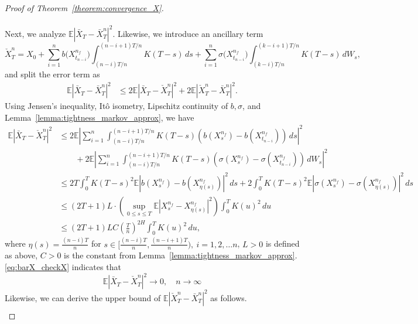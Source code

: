 \documentclass[11pt]{article}%
\theoremstyle{definition}
\begin{document}
\begin{proof}[Proof of Theorem~\ref{theorem:convergence_X}]
    \paragraph{} Next, we analyze \(\mathbb{E} |\bar{X}_T - \bar{X}_T^n|^2\). Likewise, we introduce an ancillary term 
    \begin{equation*}
        \check{X}_T^n = X_0 + \sum_{i=1}^{n} b\bigl(X_{t_{n-i}}^{n_f}\bigr) \int_{(n-i)T/n}^{(n-i+1)T/n} K(T-s)\,ds + \sum_{i=1}^{n} \sigma\bigl(X_{t_{n-i}}^{n_f}\bigr) \int_{(k-i)T/n}^{(k-i+1)T/n} K(T-s)\,dW_s,
    \end{equation*}
    and split the error term as
    \begin{align*}
        \mathbb{E} |\bar{X}_T - \bar{X}_T^n|^2 &\le 2\mathbb{E}|\bar{X}_T - \check{X}_T^n|^2 + 2\mathbb{E}|\check{X}_T^n - \bar{X}_T^n|^2.
    \end{align*}
    Using Jensen's inequality, It\^o isometry, Lipschitz continuity of \(b,\sigma\), and Lemma~\ref{lemma:tightness_markov_approx}, we have
    \begin{align}
        \mathbb{E}|\bar{X}_T - \check{X}_T^n|^2 &\le 2\mathbb{E} \left|\sum_{i=1}^n \int_{(n-i)T/n}^{(n-i+1)T/n} K(T-s) (b(X_s^{n_f}) - b(X_{t_{n-i}}^{n_f}))\,ds\right|^2\nonumber\\
        &\qquad + 2\mathbb{E}\left| \sum_{i=1}^n \int_{(n-i)T/n}^{(n-i+1)T/n} K(T-s) (\sigma(X_s^{n_f}) - \sigma(X_{t_{n-i}}^{n_f}))\,dW_s\right|^2\nonumber\\
        &\le 2T \int_{0}^{T} K(T-s)^2 \mathbb{E} |b(X_s^{n_f}) - b(X_{\eta(s)}^{n_f})|^2\,ds + 2\int_{0}^{T} K(T-s)^2 \mathbb{E} |\sigma(X_s^{n_f}) - \sigma(X_{\eta(s)}^{n_f})|^2\,ds\nonumber\\ 
        &\le (2T+1)L \cdot \left(\sup_{0\le s\le T} \mathbb{E} |X_s^{n_f} - X_{\eta(s)}^{n_f}|^2\right) \int_{0}^{T} K(u)^2 \,du\nonumber\\
        &\le (2T+1)LC \left(\frac{T}{n}\right)^{2H} \int_{0}^{T} K(u)^2 \,du,\label{eq:barX_checkX}
    \end{align}
    where \(\eta(s) = \tfrac{(n-i)T}{n}\) for \(s \in [\tfrac{(n-i)T}{n},\tfrac{(n-i+1)T}{n}),\ i=1,2,\ldots n\), \(L>0\) is defined as above, \(C>0\) is the constant from Lemma~\ref{lemma:tightness_markov_approx}. \eqref{eq:barX_checkX} indicates that 
    \[
        \mathbb{E}|\bar{X}_T - \check{X}_T^n|^2 \to 0,\quad n\to \infty
    \]
    Likewise, we can derive the upper bound of \(\mathbb{E}|\check{X}_T^n - \bar{X}_T^n|^2\) as follows.
    \begin{align}

\end{align}
\end{proof}
\end{document}

